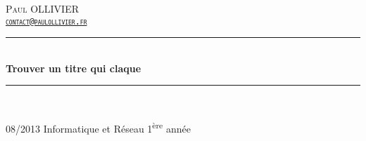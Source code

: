 \newcommand{\HRule}{\rule{\linewidth}{0.5mm}}
\begin{titlepage}
\begin{center}


\hfill\textsc{\LARGE Paul OLLIVIER\\
\hfill\href{mailto:contact@paulollivier.fr}{\texttt{contact@paulollivier.fr}}}

\vfill

\HRule \\[0.4cm]
{ \huge \bfseries Trouver un titre qui claque \\[0.4cm] }

\HRule \\[1.5cm]
\vfill

{\large 08/2013 \hfill Informatique et Réseau 1\textsuperscript{ère} année}

\end{center}
\end{titlepage}
